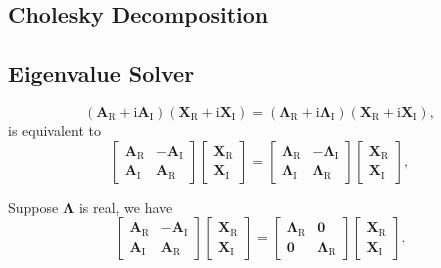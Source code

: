 \documentclass[a4paper,11pt,twoside,openright]{book}
\begin{document}
\subsection{Cholesky Decomposition}

\subsection{Eigenvalue Solver}

\begin{equation}
  \left(\mathbf{A}_{\text{R}}+\text{i}\mathbf{A}_{\text{I}}\right)%
    \left(\mathbf{X}_{\text{R}}+\text{i}\mathbf{X}_{\text{I}}\right)%
  =\left(\boldsymbol{\Lambda}_{\text{R}}+\text{i}\boldsymbol{\Lambda}_{\text{I}}\right)%
    \left(\mathbf{X}_{\text{R}}+\text{i}\mathbf{X}_{\text{I}}\right),
\end{equation}
is equivalent to
\begin{equation}
  \begin{bmatrix}
    \mathbf{A}_{\text{R}} & -\mathbf{A}_{\text{I}}\\
    \mathbf{A}_{\text{I}} & \mathbf{A}_{\text{R}}
  \end{bmatrix}
  \begin{bmatrix}
    \mathbf{X}_{\text{R}}\\
    \mathbf{X}_{\text{I}}
  \end{bmatrix}
  =\begin{bmatrix}
    \boldsymbol{\Lambda}_{\text{R}} & -\boldsymbol{\Lambda}_{\text{I}}\\
    \boldsymbol{\Lambda}_{\text{I}} & \boldsymbol{\Lambda}_{\text{R}}
  \end{bmatrix}
  \begin{bmatrix}
    \mathbf{X}_{\text{R}}\\
    \mathbf{X}_{\text{I}}
  \end{bmatrix},
\end{equation}

Suppose $\boldsymbol{\Lambda}$ is real, we have
\begin{equation}
  \begin{bmatrix}
    \mathbf{A}_{\text{R}} & -\mathbf{A}_{\text{I}}\\
    \mathbf{A}_{\text{I}} & \mathbf{A}_{\text{R}}
  \end{bmatrix}
  \begin{bmatrix}
    \mathbf{X}_{\text{R}}\\
    \mathbf{X}_{\text{I}}
  \end{bmatrix}
  =\begin{bmatrix}
    \boldsymbol{\Lambda}_{\text{R}} & \boldsymbol{0}\\
    \boldsymbol{0} & \boldsymbol{\Lambda}_{\text{R}}
  \end{bmatrix}
  \begin{bmatrix}
    \mathbf{X}_{\text{R}}\\
    \mathbf{X}_{\text{I}}
  \end{bmatrix}.
\end{equation}
\end{document}
